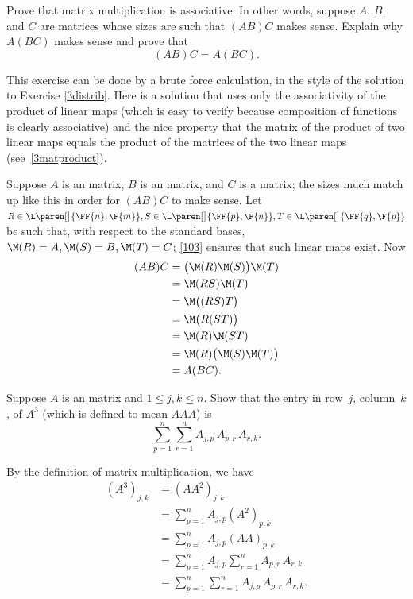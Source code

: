 \exercise
Prove that matrix multiplication is associative.  In other words, suppose $A$,
$B$, and $C$ are matrices whose sizes are such that $(AB)C$ makes sense.
Explain why $A(BC)$ makes sense and prove that\label{assoc} \[(AB)C = A(BC).\]

\begin{Solution}
This exercise can be done by a brute force calculation, in the style of the
solution to Exercise \ref{3distrib}.  Here is a solution that uses only the
associativity of the product of linear maps (which is easy to verify because
composition of functions is clearly associative) and the nice property that the
matrix of the product of two linear maps equals the product of the matrices of
the two linear maps (see~\ref{3matproduct}).

Suppose $A$ is an  matrix, $B$ is an  matrix, and $C$ is a
 matrix; the sizes much match up like this in order for $(AB)C$ to make
sense.  Let
$R \in \L\paren[\big]{\FF{n}, \F{m}}, S \in \L\paren[\big]{\FF{p}, \F{n}}, T \in \L\paren[\big]{\FF{q}, \F{p}}$ be such
that, with respect to the standard bases,
$\M(R) = A, \M(S) = B, \M(T) = C$; \ref{103} ensures that such linear maps
exist.  Now
\begin{align*}
(AB)C &= \bigl(\M(R) \M(S) \bigr) \M(T) \\
&= \M(RS) \M(T) \\
&= \M\bigl((RS)T\bigr) \\
&= \M\bigl(R(ST)\bigr) \\
&= \M(R) \M(ST) \\
&= \M(R) \bigl( \M(S) \M(T) \bigr) \\
&= A(BC).
\end{align*}
\end{Solution}

\exercise
Suppose $A$ is an  matrix and $1 \le j, k \le n$. Show that the entry in row~$j$, column~$k$, of $A^3$ (which is defined to mean $AAA$) is
\[
\sum_{p=1}^n \sum_{r=1}^n A_{j, p} \, A_{p, r} \, A_{r, k}.
\]
\vspace{-10bp}

\begin{Solution}
By the definition of matrix multiplication, we have
\begin{align*}
(A^3)_{j, k} &= (A A^2)_{j, k} \\
&= \sum_{p=1}^n A_{j, p} (A^2)_{p, k} \\
&= \sum_{p=1}^n A_{j, p} (A A)_{p, k} \\
&= \sum_{p=1}^n A_{j, p} \sum_{r=1}^n A_{p, r} \, A_{r, k} \\
&= \sum_{p=1}^n \sum_{r=1}^n A_{j, p} \, A_{p, r} \, A_{r, k}.
\end{align*}
\end{Solution}

